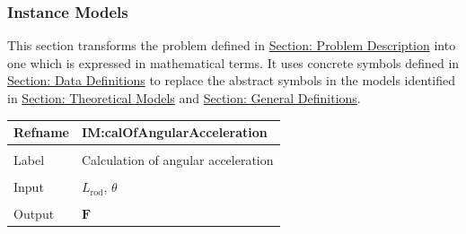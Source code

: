 \documentclass[12pt]{article}
\begin{document}
\subsubsection{Instance Models}
\label{Sec:IMs}
This section transforms the problem defined in \hyperref[Sec:ProbDesc]{Section: Problem Description} into one which is expressed in mathematical terms. It uses concrete symbols defined in \hyperref[Sec:DDs]{Section: Data Definitions} to replace the abstract symbols in the models identified in \hyperref[Sec:TMs]{Section: Theoretical Models} and \hyperref[Sec:GDs]{Section: General Definitions}.

\vspace{\baselineskip}
\noindent
\begin{minipage}{\textwidth}
\begin{tabular}{>{\raggedright}p{}>{\raggedright\arraybackslash}p{}}
\toprule \textbf{Refname} & \textbf{IM:calOfAngularAcceleration}
\label{IM:calOfAngularAcceleration}
\\ \midrule \\
Label & Calculation of angular acceleration
        
\\ \midrule \\
Input & ${L_{\text{rod}}}$, $θ$
        
\\ \midrule \\
Output & $\mathbf{F}$
         

\end{tabular}
\end{minipage}
\end{document}

